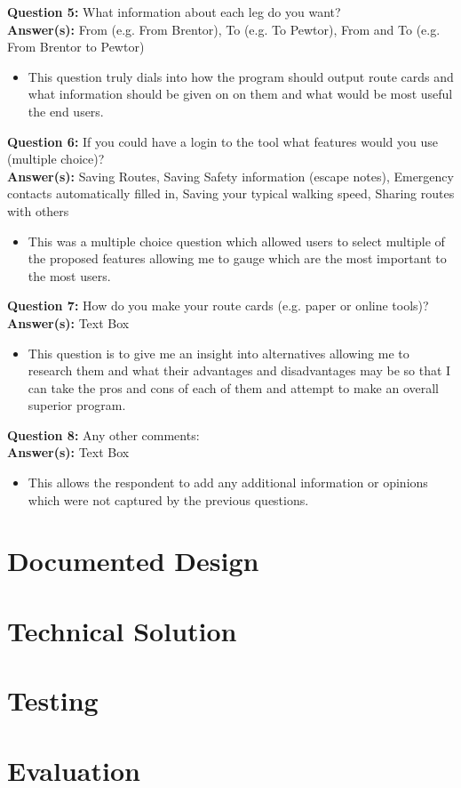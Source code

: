 \documentclass{article}
\newcommand{\QAnalysis}[4]{
    \noindent \textbf{Question #1: } #2 \\
    \noindent \textbf{Answer(s): } #3
    \begin{itemize}
        \item #4
    \end{itemize}
}
\begin{document}
            \QAnalysis{5}{What information about each leg do you want?}{From (e.g. From Brentor), To (e.g. To Pewtor), From and To (e.g. From Brentor to Pewtor)}{This question truly dials into how the program should output route cards and what information should be given on on them and what would be most useful the end users.}

            \QAnalysis{6}{If you could have a login to the tool what features would you use (multiple choice)?}{Saving Routes, Saving Safety information (escape notes), Emergency contacts automatically filled in, Saving your typical walking speed, Sharing routes with others}{This was a multiple choice question which allowed users to select multiple of the proposed features allowing me to gauge which are the most important to the most users.}

            \QAnalysis{7}{How do you make your route cards (e.g. paper or online tools)?}{Text Box}{This question is to give me an insight into alternatives allowing me to research them and what their advantages and disadvantages may be so that I can take the pros and cons of each of them and attempt to make an overall superior program.}

            \QAnalysis{8}{Any other comments:}{Text Box}{This allows the respondent to add any additional information or opinions which were not captured by the previous questions.}
    
\newpage

\section{Documented Design}

    

\newpage
    
\section{Technical Solution}

    

\newpage

\section{Testing}

    

\newpage

\section{Evaluation}

    
    
\end{document}
